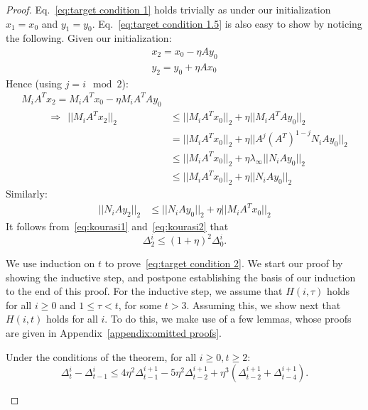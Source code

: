 \begin{proof}
Eq.~\eqref{eq:target condition 1} holds trivially as under our initialization $x_1=x_0$ and $y_1=y_0$. Eq.~\eqref{eq:target condition 1.5} is also easy to show by noticing the following. Given our initialization:
\begin{align*}
x_2=x_0-\eta A y_0\\
y_2=y_0+\eta A x_0
\end{align*}
Hence (using $j=i \mod 2$):
\begin{align}
M_iA^Tx_2=M_iA^Tx_0 - \eta M_iA^TA y_0\\~~~~~~~~~~~~\Rightarrow~~||M_iA^Tx_2||_2 &\le ||M_iA^Tx_0||_2+\eta ||M_iA^TA y_0||_2\\
&= ||M_iA^Tx_0||_2+\eta ||A^j(A^T)^{1-j}N_iA y_0||_2\\
&\le ||M_iA^Tx_0||_2+\eta \lambda_{\infty} ||N_iA y_0||_2\\
&\le ||M_iA^Tx_0||_2+\eta  ||N_iA y_0||_2 \label{eq:kourasi1}
\end{align}
Similarly:
\begin{align}
||N_iAy_2||_2 &\le ||N_iAy_0||_2+\eta  ||M_iA^T x_0||_2 \label{eq:kourasi2}
\end{align}
It follows from~\eqref{eq:kourasi1} and~\eqref{eq:kourasi2} that
$$\Delta^i_2 \le (1+\eta)^2 \Delta^i_0.$$

We use induction on $t$ to prove~\eqref{eq:target condition 2}. We start our proof by showing the inductive step, and postpone establishing the basis of our induction to the end of this proof. For the inductive step, we assume that $H(i,\tau)$ holds for all $i \ge 0$ and $1\le \tau < t$, for some $t>3$. Assuming this, we show next that $H(i,t)$ holds for all $i$. To do this, we make use of a few lemmas, whose proofs are given in Appendix~\ref{appendix:omitted proofs}. 
	
    \begin{lemma} \label{lemma:restated bound} Under the conditions of the theorem, for all $i \ge 0, t \ge 2$:
$$\Delta^i_t - \Delta^i_{t-1} \leq 4\eta^2\Delta^{i+1}_{t-1} - 5\eta^2\Delta^{i+1}_{t-2} +
    \eta^3(\Delta_{t-2}^{i+1} + \Delta_{t-4}^{i+1}).$$

		
    \end{lemma}
		

\end{proof}
